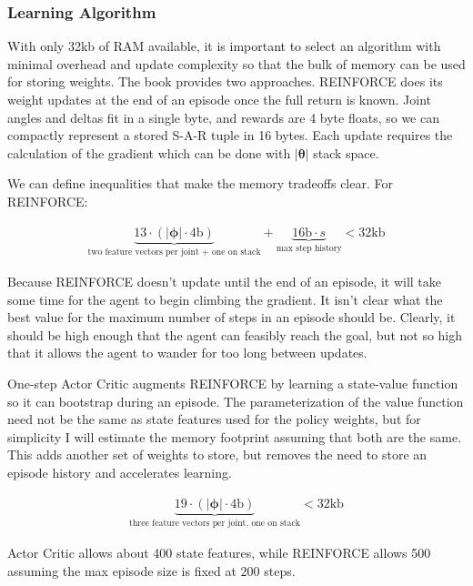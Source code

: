 \documentclass{article}
\newcommand{\thetab}{\bm{\theta}}
\newcommand{\phib}{\bm{\phi}}
\begin{document}
\subsubsection{Learning Algorithm}

With only 32kb of RAM available, it is important to select an algorithm with minimal overhead and update complexity so that the bulk of memory can be used for storing weights. The book provides two approaches. REINFORCE does its weight updates at the end of an episode once the full return is known. Joint angles and deltas fit in a single byte, and rewards are 4 byte floats, so we can compactly represent a stored S-A-R tuple in 16 bytes. Each update requires the calculation of the gradient which can be done with $|\thetab|$ stack space.

We can define inequalities that make the memory tradeoffs clear. For REINFORCE:

\begin{gather*}
 \underbrace{13 \cdot (|\phib| \cdot 4\text{b})}_{\text{two feature vectors per joint + one on stack}} +  \underbrace{16\text{b} \cdot s}_{\text{max step history}} < 32\text{kb}
\end{gather*}


Because REINFORCE doesn't update until the end of an episode, it will take some time for the agent to begin climbing the gradient. It isn't clear what the best value for the maximum number of steps in an episode should be. Clearly, it should be high enough that the agent can feasibly reach the goal, but not so high that it allows the agent to wander for too long between updates.

One-step Actor Critic augments REINFORCE by learning a state-value function so it can bootstrap during an episode. The parameterization of the value function need not be the same as state features used for the policy weights, but for simplicity I will estimate the memory footprint assuming that both are the same. This adds another set of weights to store, but removes the need to store an episode history and accelerates learning.

\begin{gather*}
\underbrace{19 \cdot (|\phib| \cdot 4\text{b})}_{\text{three feature vectors per joint, one on stack}}  < 32\text{kb}
\end{gather*}

Actor Critic allows about 400 state features, while REINFORCE allows 500 assuming the max episode size is fixed at 200 steps.
\end{document}
